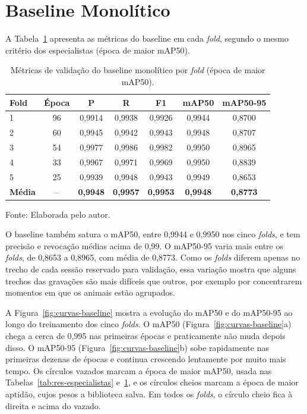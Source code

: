 \section{Baseline Monolítico}
\label{sec:res-baseline}

A Tabela~\ref{tab:res-baseline} apresenta as métricas do baseline em cada \textit{fold}, segundo o mesmo critério dos especialistas (época de maior mAP50).

\begin{table}[htb]
\centering
\caption{Métricas de validação do baseline monolítico por \textit{fold} (época de maior mAP50).}
\label{tab:res-baseline}
\begin{tabular}{lcccccc}
\hline
\textbf{Fold} & \textbf{Época} & \textbf{P} & \textbf{R} & \textbf{F1} & \textbf{mAP50} & \textbf{mAP50-95} \\
\hline
1 & 96 & 0,9914 & 0,9938 & 0,9926 & 0,9944 & 0,8700 \\
2 & 60 & 0,9945 & 0,9942 & 0,9943 & 0,9948 & 0,8707 \\
3 & 54 & 0,9977 & 0,9986 & 0,9982 & 0,9950 & 0,8965 \\
4 & 33 & 0,9967 & 0,9971 & 0,9969 & 0,9950 & 0,8839 \\
5 & 25 & 0,9939 & 0,9948 & 0,9943 & 0,9949 & 0,8653 \\
\hline
\textbf{Média} & -- & \textbf{0,9948} & \textbf{0,9957} & \textbf{0,9953} & \textbf{0,9948} & \textbf{0,8773} \\
\hline
\end{tabular}

\vspace{0.2cm}
Fonte: Elaborada pelo autor.
\end{table}

O baseline também satura o mAP50, entre 0,9944 e 0,9950 nos cinco \textit{folds}, e tem precisão e revocação médias acima de 0,99. O mAP50-95 varia mais entre os \textit{folds}, de 0,8653 a 0,8965, com média de 0,8773. Como os \textit{folds} diferem apenas no trecho de cada sessão reservado para validação, essa variação mostra que alguns trechos das gravações são mais difíceis que outros, por exemplo por concentrarem momentos em que os animais estão agrupados.

A Figura~\ref{fig:curvas-baseline} mostra a evolução do mAP50 e do mAP50-95 ao longo do treinamento dos cinco \textit{folds}. O mAP50 (Figura~\ref{fig:curvas-baseline}a) chega a cerca de 0,995 nas primeiras épocas e praticamente não muda depois disso. O mAP50-95 (Figura~\ref{fig:curvas-baseline}b) sobe rapidamente nas primeiras dezenas de épocas e continua crescendo lentamente por muito mais tempo. Os círculos vazados marcam a época de maior mAP50, usada nas Tabelas~\ref{tab:res-especialistas} e~\ref{tab:res-baseline}, e os círculos cheios marcam a época de maior aptidão, cujos pesos a biblioteca salva. Em todos os \textit{folds}, o círculo cheio fica à direita e acima do vazado.

